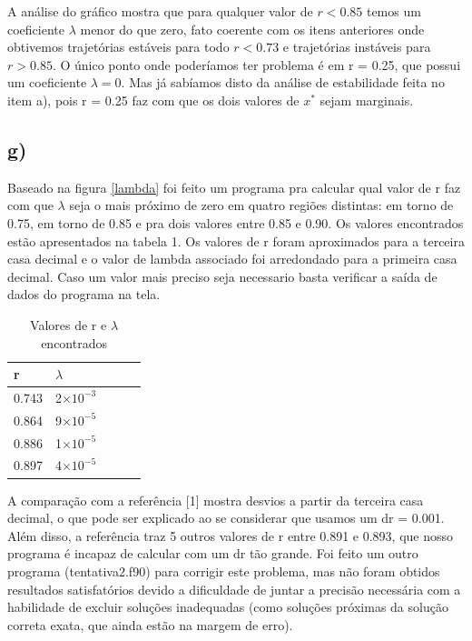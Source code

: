 \documentclass[a4wide]{report}
\begin{document}
A análise do gráfico mostra que para qualquer valor de $r < 0.85 $ temos um coeficiente $\lambda$ menor do que zero, fato coerente com os itens anteriores onde obtivemos trajetórias estáveis para todo $ r < 0.73$ e trajetórias instáveis para $r > 0.85$. O único ponto onde poderíamos ter problema é em r = 0.25, que possui um coeficiente $\lambda = 0$. Mas já sabíamos disto da análise de estabilidade feita no item a), pois r = 0.25 faz com que os dois valores de $x^*$ sejam marginais.

\subsection*{g)}

Baseado na figura \ref{lambda} foi feito um programa pra calcular qual valor de r faz com que $\lambda$ seja o mais próximo de zero em quatro regiões distintas: em torno de 0.75, em torno de 0.85 e pra dois valores entre 0.85 e 0.90. Os valores encontrados estão apresentados na tabela 1. Os valores de r foram aproximados para a terceira casa decimal e o valor de lambda associado foi arredondado para a primeira casa decimal. Caso um valor mais preciso seja necessario basta verificar a saída de dados do programa na tela.

\begin{table}[!h]
\centering
\begin{tabular}{|l|l|l|l|l|}
\hline
r  & $\lambda$   \\ \hline
0.743  & 2$\times 10^{-3}$  \\ \hline
0.864 & 9$\times 10^{-5}$   \\ \hline
0.886 & 1$\times 10^{-5}$  \\ \hline
0.897 & 4$\times 10^{-5}$  \\ \hline
\end{tabular}
\caption{Valores de r e $\lambda$ encontrados}
\label{tabela1}
\end{table}

A comparação com a referência [1] mostra desvios a partir da terceira casa decimal, o que pode ser explicado ao se considerar que usamos um dr = 0.001. Além disso, a referência traz 5 outros valores de r entre 0.891 e 0.893, que nosso programa é incapaz de calcular com um dr tão grande. Foi feito um outro programa (tentativa2.f90) para corrigir este problema, mas não foram obtidos resultados satisfatórios devido a dificuldade de juntar a precisão necessária com a habilidade de excluir soluções inadequadas (como soluções próximas da solução correta exata, que ainda estão na margem de erro).
\end{document}
